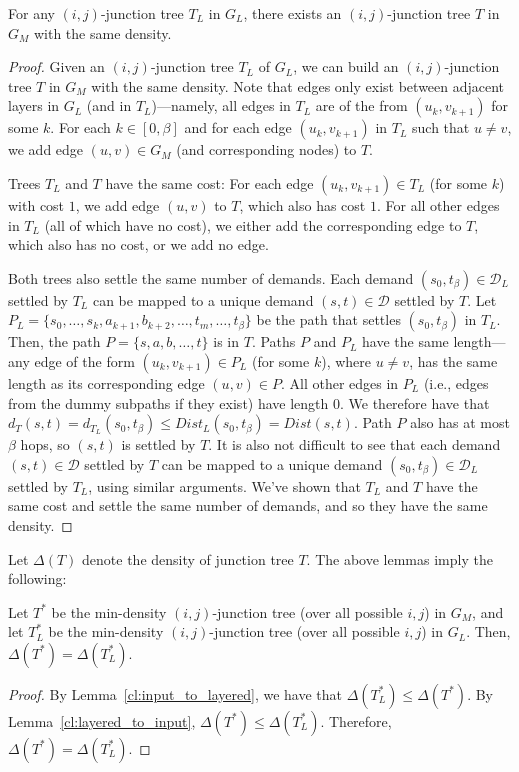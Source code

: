 \begin{lemma}
\label{cl:layered_to_input}
    For any $(i,j)$-junction tree $T_L$ in $G_L$, there exists an $(i,j)$-junction tree $T$ in $G_M$ with the same density.
\end{lemma}
\begin{proof}
     Given an $(i,j)$-junction tree $T_L$ of $G_L$, we can build an $(i,j)$-junction tree $T$ in $G_M$ with the same density. Note that edges only exist between adjacent layers in $G_L$ (and in $T_L$)---namely, all edges in $T_L$ are of the from $(u_k, v_{k+1})$ for some $k$. For each $k \in [0, \beta]$ and for each edge $(u_k, v_{k+1})$ in $T_L$ such that $u \neq v$, we add edge $(u, v) \in G_M$ (and corresponding nodes) to $T$. 
    
    Trees $T_L$ and $T$ have the same cost: For each edge $(u_k, v_{k+1}) \in T_L$ (for some $k$) with cost $1$, we add edge $(u,v)$ to $T$, which also has cost $1$. For all other edges in $T_L$ (all of which have no cost), we either add the corresponding edge to $T$, which also has no cost, or we add no edge. 
    
    Both trees also settle the same number of demands. Each demand $(s_0, t_\beta) \in \mathcal{D}_L$ settled by $T_L$ can be mapped to a unique demand $(s,t) \in \mathcal{D}$ settled by $T$. Let $P_L = \{s_0, \dots, s_k, a_{k+1}, b_{k+2}, \dots, t_{m}, \dots , t_\beta \}$ be the path that settles $(s_0, t_\beta)$ in $T_L$. Then, the path $P = \{s, a, b, \dots, t\}$ is in $T$. Paths $P$ and $P_L$ have the same length---any edge of the form $(u_k,v_{k+1}) \in P_L$ (for some $k$), where $u \neq v$, has the same length as its corresponding edge $(u, v) \in P$. All other edges in $P_L$ (i.e., edges from the dummy subpaths if they exist) have length $0$. We therefore have that $d_T(s,t) = d_{T_L}(s_0,t_\beta) \leq Dist_{L}(s_0,t_\beta) = Dist(s,t)$. Path $P$ also has at most $\beta$ hops, so $(s,t)$ is settled by $T$. It is also not difficult to see that each demand $(s, t) \in \mathcal{D}$ settled by $T$ can be mapped to a unique demand $(s_0,t_\beta) \in \mathcal{D}_L$ settled by $T_L$, using similar arguments. We've shown that $T_L$ and $T$ have the same cost and settle the same number of demands, and so they have the same density.
\end{proof}

Let $\Delta(T)$ denote the density of junction tree $T$. The above lemmas imply the following:

\begin{corollary}
\label{cor:equivalent}
    Let $T^*$ be the min-density $(i,j)$-junction tree (over all possible $i,j$) in $G_M$, and let $T_L^*$ be the min-density $(i,j)$-junction tree (over all possible $i,j$) in $G_L$. Then, $\Delta(T^*) = \Delta(T_L^*)$.
\end{corollary}
\begin{proof}
    By Lemma~\ref{cl:input_to_layered}, we have that $\Delta(T_L^*) \leq \Delta(T^*)$.  By Lemma~\ref{cl:layered_to_input}, $\Delta(T^*) \leq \Delta(T_L^*)$. Therefore, $\Delta(T^*) = \Delta(T_L^*)$.
\end{proof}

